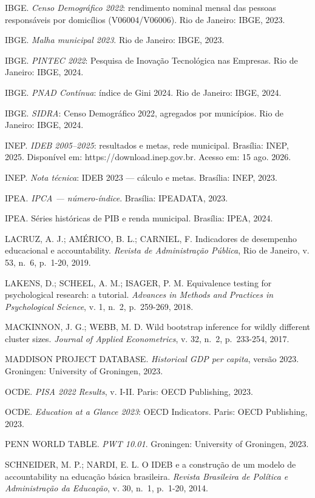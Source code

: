 \documentclass[
  brazilian,
  12pt,
  a4paper,
]{article}
\begin{document}
IBGE. \emph{Censo Demográfico 2022}: rendimento nominal mensal das
pessoas responsáveis por domicílios (V06004/V06006). Rio de Janeiro:
IBGE, 2023.

IBGE. \emph{Malha municipal 2023}. Rio de Janeiro: IBGE, 2023.

IBGE. \emph{PINTEC 2022}: Pesquisa de Inovação Tecnológica nas Empresas.
Rio de Janeiro: IBGE, 2024.

IBGE. \emph{PNAD Contínua}: índice de Gini 2024. Rio de Janeiro: IBGE,
2024.

IBGE. \emph{SIDRA}: Censo Demográfico 2022, agregados por municípios.
Rio de Janeiro: IBGE, 2024.

INEP. \emph{IDEB 2005--2025}: resultados e metas, rede municipal.
Brasília: INEP, 2025. Disponível em: https://download.inep.gov.br.
Acesso em: 15 ago. 2026.

INEP. \emph{Nota técnica}: IDEB 2023 --- cálculo e metas. Brasília:
INEP, 2023.

IPEA. \emph{IPCA --- número-índice}. Brasília: IPEADATA, 2023.

IPEA. Séries históricas de PIB e renda municipal. Brasília: IPEA, 2024.

LACRUZ, A. J.; AMÉRICO, B. L.; CARNIEL, F. Indicadores de desempenho
educacional e accountability. \emph{Revista de Administração Pública},
Rio de Janeiro, v. 53, n.~6, p.~1-20, 2019.

LAKENS, D.; SCHEEL, A. M.; ISAGER, P. M. Equivalence testing for
psychological research: a tutorial. \emph{Advances in Methods and
Practices in Psychological Science}, v. 1, n.~2, p.~259-269, 2018.

MACKINNON, J. G.; WEBB, M. D. Wild bootstrap inference for wildly
different cluster sizes. \emph{Journal of Applied Econometrics}, v. 32,
n.~2, p.~233-254, 2017.

MADDISON PROJECT DATABASE. \emph{Historical GDP per capita}, versão
2023. Groningen: University of Groningen, 2023.

OCDE. \emph{PISA 2022 Results}, v. I-II. Paris: OECD Publishing, 2023.

OCDE. \emph{Education at a Glance 2023}: OECD Indicators. Paris: OECD
Publishing, 2023.

PENN WORLD TABLE. \emph{PWT 10.01}. Groningen: University of Groningen,
2023.

SCHNEIDER, M. P.; NARDI, E. L. O IDEB e a construção de um modelo de
accountability na educação básica brasileira. \emph{Revista Brasileira
de Política e Administração da Educação}, v. 30, n.~1, p.~1-20, 2014.
\end{document}
